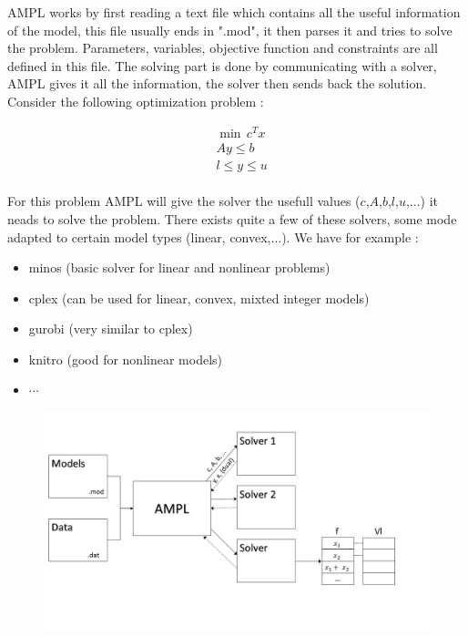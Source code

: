 AMPL works by first reading a text file which contains all the useful information of the model, this file usually ends in ".mod", it then parses it and tries to solve the problem. Parameters, variables, objective function and constraints are all defined in this file. The solving part is done by communicating with a solver, AMPL gives it all the information, the solver then sends back the solution. 
Consider the following optimization problem :

\begin{align*}
          &\min \, c^Tx  \\ 
       	 & Ay\le b\\
	 & l\le y\le u
\end{align*}
\\

For this problem AMPL will give the solver the usefull values ($c$,$A$,$b$,$l$,$u$,...) it neads to solve the problem. There exists quite a few of these solvers, some mode adapted to certain model types (linear, convex,...). 
We have for example :  \\

\begin{itemize}
  \item minos (basic solver for linear and nonlinear problems)
  \item cplex (can be used for linear, convex, mixted integer models)
  \item gurobi (very similar to cplex)
  \item knitro (good for nonlinear models)
  \item $\cdots$
\end{itemize} 

\begin{figure}[h!]
\centering
\includegraphics[width=\textwidth]{./images/Course1_Slide2.JPG}
\caption{}
\label{Figure2}
\end{figure} 

